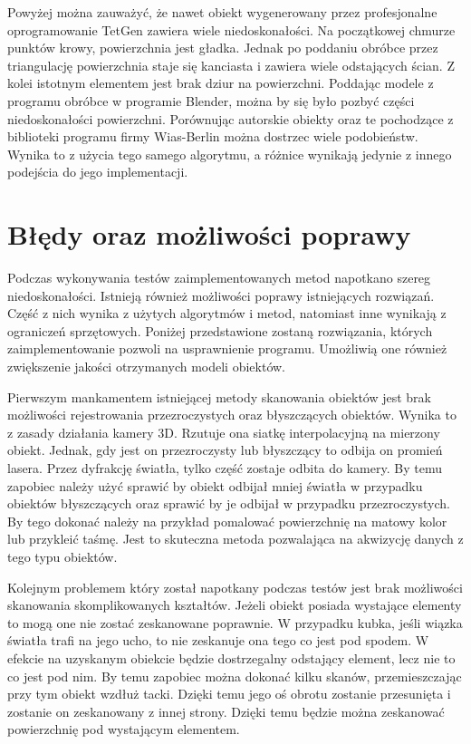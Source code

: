 Powyżej można zauważyć, że nawet obiekt wygenerowany przez profesjonalne oprogramowanie TetGen zawiera wiele niedoskonałości. Na początkowej chmurze punktów krowy, powierzchnia jest gładka. Jednak po poddaniu obróbce przez triangulację powierzchnia staje się kanciasta i zawiera wiele odstających ścian. Z kolei istotnym elementem jest brak dziur na powierzchni. Poddając modele z programu obróbce w programie Blender, można by się było pozbyć części niedoskonałości powierzchni. Porównując autorskie obiekty oraz te pochodzące z biblioteki programu firmy Wias-Berlin można dostrzec wiele podobieństw. Wynika to z użycia tego samego algorytmu, a różnice wynikają jedynie z innego podejścia do jego implementacji.


\section{Błędy oraz możliwości poprawy}
Podczas wykonywania testów zaimplementowanych metod napotkano szereg niedoskonałości. Istnieją również możliwości poprawy istniejących rozwiązań. Część z nich wynika z użytych algorytmów i metod, natomiast inne wynikają z ograniczeń sprzętowych. Poniżej przedstawione zostaną rozwiązania, których zaimplementowanie pozwoli na usprawnienie programu. Umożliwią one również zwiększenie jakości otrzymanych modeli obiektów.

Pierwszym mankamentem istniejącej metody skanowania obiektów jest brak możliwości rejestrowania przezroczystych oraz błyszczących obiektów. Wynika to z zasady działania kamery 3D. Rzutuje ona siatkę interpolacyjną na mierzony obiekt. Jednak, gdy jest on przezroczysty lub błyszczący to odbija on promień lasera. Przez dyfrakcję światła, tylko część zostaje odbita do kamery. By temu zapobiec należy użyć sprawić by obiekt odbijał mniej światła w przypadku obiektów błyszczących oraz sprawić by je odbijał w przypadku przezroczystych. By tego dokonać należy na przykład pomalować powierzchnię na matowy kolor lub przykleić taśmę. Jest to skuteczna metoda pozwalająca na akwizycję danych z tego typu obiektów. 

Kolejnym problemem który został napotkany podczas testów jest brak możliwości skanowania skomplikowanych kształtów. Jeżeli obiekt posiada wystające elementy to mogą one nie zostać zeskanowane poprawnie. W przypadku kubka, jeśli wiązka światła trafi na jego ucho, to nie zeskanuje ona tego co jest pod spodem. W efekcie na uzyskanym obiekcie będzie dostrzegalny odstający element, lecz nie to co jest pod nim. By temu zapobiec można dokonać kilku skanów, przemieszczając przy tym obiekt wzdłuż tacki. Dzięki temu jego oś obrotu zostanie przesunięta i zostanie on zeskanowany z innej strony. Dzięki temu będzie można zeskanować powierzchnię pod wystającym elementem.

